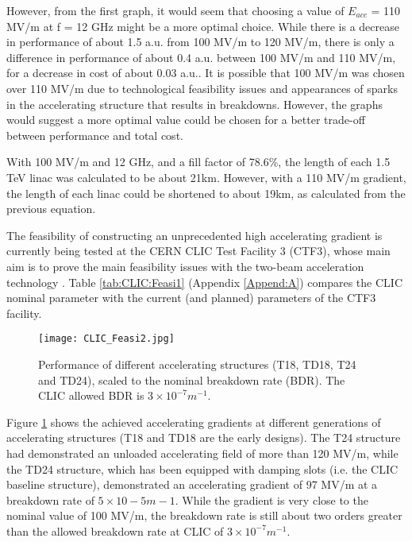 However, from the first graph, it would seem that choosing a value of $E_{acc}$ = 110 MV/m at f = 12 GHz might be a more optimal choice. While there is a decrease in performance of about 1.5 a.u. from 100 MV/m to 120 MV/m, there is only a difference in performance of about 0.4 a.u. between 100 MV/m and 110 MV/m, for a decrease in cost of about 0.03 a.u.. It is possible that 100 MV/m was chosen over 110 MV/m due to technological feasibility issues and appearances of sparks in the accelerating structure that results in breakdowns. However, the graphs would suggest a more optimal value could be chosen for a better trade-off between performance and total cost.

With 100 MV/m and 12 GHz, and a fill factor of 78.6\%, the length of each 1.5 TeV linac was calculated to be about 21km. However, with a 110 MV/m gradient, the length of each linac could be shortened to about 19km, as calculated from the previous equation.

The feasibility of constructing an unprecedented high accelerating gradient is currently being tested at the CERN CLIC Test Facility 3 (CTF3), whose main aim is to prove the main feasibility issues with the two-beam acceleration technology \cite{Nuclear:CTF3}. Table \ref{tab:CLIC:Feasi1} (Appendix \ref{Append:A}) compares the CLIC nominal parameter with the current (and planned) parameters of the CTF3 facility.

\begin{figure}[!htb]
    \centering
    \texttt{[image: CLIC\_Feasi2.jpg]}
    
    \caption{Performance of different accelerating structures (T18, TD18, T24 and TD24), scaled to the nominal breakdown rate (BDR). The CLIC allowed BDR is $3 \times 10^{-7} m^{-1}$. \cite{ICFA:BeamDynPress}}
    \label{fig:CLIC:Feasi2}
\end{figure} %

Figure \ref{fig:CLIC:Feasi2} shows the achieved accelerating gradients at different generations of accelerating structures (T18 and TD18 are the early designs). The T24 structure had demonstrated an unloaded accelerating field of more than 120 MV/m, while the TD24 structure, which has been equipped with damping slots (i.e. the CLIC baseline structure), demonstrated an accelerating gradient of 97 MV/m at a breakdown rate of $5 \times 10-5 m-1$. While the gradient is very close to the nominal value of 100 MV/m, the breakdown rate is still about two orders greater than the allowed breakdown rate at CLIC of $3 \times 10^{-7} m^{-1}$.

